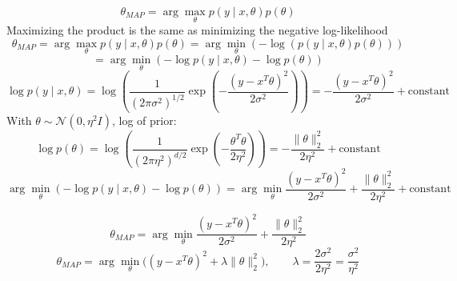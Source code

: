 \begin{answer}

$$
\theta_{MAP}​= \arg\max_{\theta} p(y \mid x, \theta) p(\theta)
$$
Maximizing the product is the same as minimizing the negative log-likelihood
$$
\theta_{MAP}​= \arg\max_{\theta} p(y \mid x, \theta) p(\theta) = \arg \min_{\theta} \left( -\log(p(y \mid x, \theta) p(\theta)) \right )
$$
$$
= \arg \min_{\theta} \left ( -\log​ p(y \mid x, \theta) - \log p(\theta) \right )
$$$$
\log p(y \mid x, \theta) = \log \left(\frac{1}{(2\pi\sigma^2)^{1/2}} \exp\left( -\frac{(y-x^T \theta)^2}{2\sigma^{2}} \right) \right) = -\frac{(y-x^T \theta)^2}{2\sigma^{2}} + \text{constant}
$$
With $\theta \sim \mathcal{N}(0,\eta^2 I)$, log of prior:
$$
\log p(\theta) = \log \left( \frac{1}{(2\pi\eta^{2})^{d/2}} \exp\left( -\frac{\theta^{T}\theta}{2\eta^{2}} \right) \right) = -\frac{\|\theta\|^2_{2}}{2\eta^{2}} + \text{constant}
$$
$$
\arg \min_{\theta} \left ( -\log​ p(y \mid x, \theta) - \log p(\theta) \right ) = \arg \min_{\theta} \frac{(y-x^T \theta)^2}{2\sigma^{2}} + \frac{\|\theta\|^2_{2}}{2\eta^{2}} + \text{constant}
$$

$$
\theta_{MAP}​ = \arg \min_{\theta} \frac{(y-x^T \theta)^2}{2\sigma^{2}} + \frac{\|\theta\|^2_{2}}{2\eta^{2}}
$$
$$
\boxed{ \theta_{MAP} = \arg\min_{\theta} \Big( (y-x^T \theta)^{2} + \lambda\|\theta\|_2^{2} \Big), \qquad \lambda = \frac{2\sigma^{2}}{2\eta^{2}} = \frac{\sigma^{2}}{\eta^{2}} }
$$
\end{answer}
